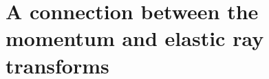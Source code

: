 \documentclass[11pt]{article}
\newcommand{\Rb}{\mathbb{R}}
\newcommand{\sch}{\mathcal{S}}
\renewcommand{\d}{\mathrm{d}}
\newtheorem{theorem}{Theorem}[]
\newcommand{\antti}[1]{\textcolor{red}{Antti's comment: #1}}
\begin{document}



\section{A connection between the momentum and elastic ray transforms}
\label{sec:relation between integral transform}
\end{document}
